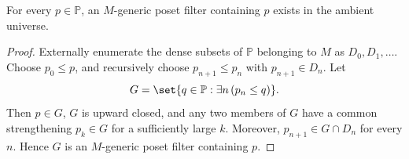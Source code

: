 \begin{lemma}
For every \(p\in\mathbb P\), an \(M\)-generic poset filter containing \(p\)
exists in the ambient universe.
\end{lemma}

\begin{proof}
Externally enumerate the dense subsets of \(\mathbb P\) belonging to \(M\) as
\(D_0,D_1,\ldots\).  Choose \(p_0\leq p\), and recursively choose
\(p_{n+1}\leq p_n\) with \(p_{n+1}\in D_n\).  Let
\[
  G=\set{q\in\mathbb P:\exists n\,(p_n\leq q)}.
\]
Then \(p\in G\), \(G\) is upward closed, and any two members of \(G\) have a
common strengthening \(p_k\in G\) for a sufficiently large \(k\).  Moreover,
\(p_{n+1}\in G\cap D_n\) for every \(n\).  Hence \(G\) is an \(M\)-generic
poset filter containing \(p\).
\end{proof}

